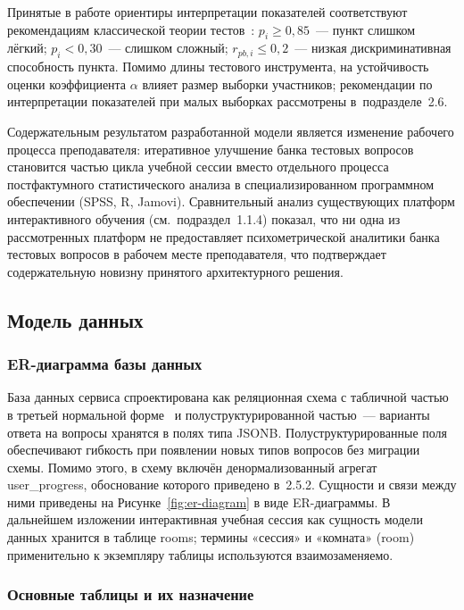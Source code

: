 Принятые в работе ориентиры интерпретации показателей соответствуют
рекомендациям классической теории тестов~\cite{crocker_algina}:
$p_i \geq 0{,}85$~--- пункт слишком лёгкий; $p_i < 0{,}30$~---
слишком сложный; $r_{pb,i} \leq 0{,}2$~--- низкая дискриминативная
способность пункта. Помимо длины тестового инструмента, на устойчивость
оценки коэффициента $\alpha$ влияет размер выборки участников;
рекомендации по интерпретации показателей при малых выборках
рассмотрены в~подразделе~2.6.

Содержательным результатом разработанной модели является изменение
рабочего процесса преподавателя: итеративное улучшение банка
тестовых вопросов становится частью цикла учебной сессии вместо
отдельного процесса постфактумного статистического анализа
в специализированном программном обеспечении (SPSS, R, Jamovi).
Сравнительный анализ существующих платформ интерактивного обучения
(см.~подраздел~1.1.4) показал, что ни одна из рассмотренных
платформ не предоставляет психометрической аналитики банка
тестовых вопросов в рабочем месте преподавателя, что подтверждает
содержательную новизну принятого архитектурного решения.

\subsection{Модель данных}

\subsubsection{ER-диаграмма базы данных}

База данных сервиса спроектирована как реляционная схема
с табличной частью в третьей нормальной форме~\cite{kleppmann2017}
и полуструктурированной частью~--- варианты ответа на вопросы
хранятся в полях типа JSONB. Полуструктурированные поля обеспечивают
гибкость при появлении новых типов вопросов без миграции схемы.
Помимо этого, в схему включён денормализованный агрегат
user\_progress, обоснование которого приведено в~2.5.2.
Сущности и связи между ними приведены на Рисунке~\ref{fig:er-diagram}
в виде ER-диаграммы. В дальнейшем изложении интерактивная учебная
сессия как сущность модели данных хранится в таблице
rooms; термины «сессия» и «комната» (room) применительно
к экземпляру таблицы используются взаимозаменяемо.


\subsubsection{Основные таблицы и их назначение}

